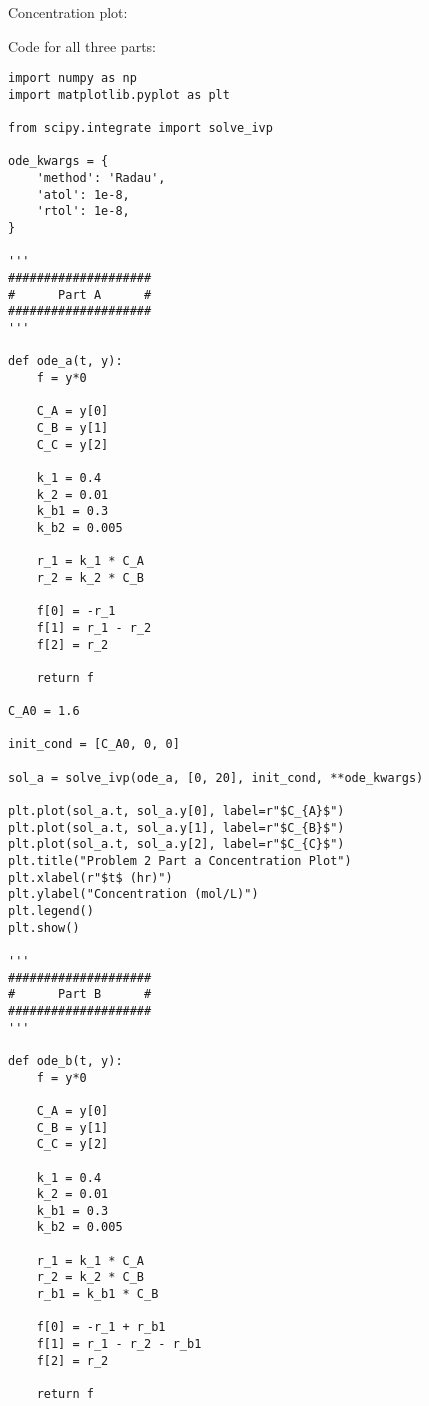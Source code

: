 \documentclass[12pt]{article}
\begin{document}
\begin{enumerate}
\begin{enumerate}
        Concentration plot:

        \begin{center}
            
        \end{center}
    \end{enumerate}

    Code for all three parts:

\begin{verbatim}
import numpy as np
import matplotlib.pyplot as plt

from scipy.integrate import solve_ivp

ode_kwargs = {
    'method': 'Radau',
    'atol': 1e-8,
    'rtol': 1e-8,
}

'''
####################
#      Part A      #
####################
'''

def ode_a(t, y):
    f = y*0

    C_A = y[0]
    C_B = y[1]
    C_C = y[2]

    k_1 = 0.4
    k_2 = 0.01
    k_b1 = 0.3
    k_b2 = 0.005

    r_1 = k_1 * C_A
    r_2 = k_2 * C_B

    f[0] = -r_1
    f[1] = r_1 - r_2
    f[2] = r_2

    return f

C_A0 = 1.6

init_cond = [C_A0, 0, 0]

sol_a = solve_ivp(ode_a, [0, 20], init_cond, **ode_kwargs)

plt.plot(sol_a.t, sol_a.y[0], label=r"$C_{A}$")
plt.plot(sol_a.t, sol_a.y[1], label=r"$C_{B}$")
plt.plot(sol_a.t, sol_a.y[2], label=r"$C_{C}$")
plt.title("Problem 2 Part a Concentration Plot")
plt.xlabel(r"$t$ (hr)")
plt.ylabel("Concentration (mol/L)")
plt.legend()
plt.show()

'''
####################
#      Part B      #
####################
'''

def ode_b(t, y):
    f = y*0

    C_A = y[0]
    C_B = y[1]
    C_C = y[2]

    k_1 = 0.4
    k_2 = 0.01
    k_b1 = 0.3
    k_b2 = 0.005

    r_1 = k_1 * C_A
    r_2 = k_2 * C_B
    r_b1 = k_b1 * C_B

    f[0] = -r_1 + r_b1
    f[1] = r_1 - r_2 - r_b1
    f[2] = r_2

    return f


\end{verbatim}
\end{enumerate}
\end{document}
